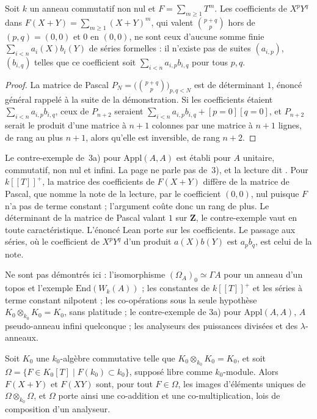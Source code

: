\begin{enonce}
Soit $k$ un anneau commutatif non nul et $F = \sum_{m \ge 1} T^m$. Les coefficients de $X^p Y^q$ dans $F(X + Y) = \sum_{m \ge 1} (X + Y)^m$, qui valent $\binom{p+q}{p}$ hors de $(p, q) = (0, 0)$ et $0$ en $(0, 0)$, ne sont ceux d'aucune somme finie $\sum_{i < n} a_i(X) b_i(Y)$ de séries formelles : il n'existe pas de suites $(a_{i,p})$, $(b_{i,q})$ telles que ce coefficient soit $\sum_{i < n} a_{i,p} b_{i,q}$ pour tous $p, q$.
\end{enonce}

\begin{proof}
La matrice de Pascal $P_N = \bigl(\binom{p+q}{p}\bigr)_{p, q < N}$ est de déterminant $1$, énoncé général rappelé à la suite de la démonstration. Si les coefficients étaient $\sum_{i < n} a_{i,p} b_{i,q}$, ceux de $P_{n+2}$ seraient $\sum_{i < n} a_{i,p} b_{i,q} + [p = 0][q = 0]$, et $P_{n+2}$ serait le produit d'une matrice à $n + 1$ colonnes par une matrice à $n + 1$ lignes, de rang au plus $n + 1$, alors qu'elle est inversible, de rang $n + 2$.
\end{proof}

\begin{remarque}
Le contre-exemple de~3a) pour $\mathrm{Appl}(A, A)$ est établi pour $A$ unitaire, commutatif, non nul et infini. La page ne parle pas de~3), et la lecture dit . Pour $k[[T]]^+$, la matrice des coefficients de $F(X + Y)$ diffère de la matrice de Pascal, que nomme la note de la lecture, par le coefficient $(0,0)$, nul puisque $F$ n'a pas de terme constant ; l'argument coûte donc un rang de plus. Le déterminant de la matrice de Pascal valant $1$ sur $\mathbf Z$, le contre-exemple vaut en toute caractéristique. L'énoncé Lean porte sur les coefficients. Le passage aux séries, où le coefficient de $X^p Y^q$ d'un produit $a(X) b(Y)$ est $a_p b_q$, est celui de la note.
\end{remarque}

Ne sont pas démontrés ici : l'isomorphisme $(\Omega_A)_0 \simeq \Gamma A$ pour un anneau d'un topos et l'exemple $\mathrm{End}(W_k(A))$ ; les constantes de $k[[T]]^+$ et les séries à terme constant nilpotent ; les co-opérations sous la seule hypothèse $K_0 \otimes_{k_0} K_0 = K_0$, sans platitude ; le contre-exemple de 3a) pour $\mathrm{Appl}(A,A)$, $A$ pseudo-anneau infini quelconque ; les analyseurs des puissances divisées et des $\lambda$-anneaux.

\begin{encadre}
\begin{theoreme}\nonverifie
Soit $K_0$ une $k_0$-algèbre commutative telle que $K_0 \otimes_{k_0} K_0 = K_0$, et soit $\Omega = \{F \in K_0[T] \mid F(k_0) \subset k_0\}$, supposé libre comme $k_0$-module. Alors $F(X + Y)$ et $F(XY)$ sont, pour tout $F \in \Omega$, les images d'éléments uniques de $\Omega \otimes_{k_0} \Omega$, et $\Omega$ porte ainsi une co-addition et une co-multiplication, lois de composition d'un analyseur.
\end{theoreme}
\end{encadre}
